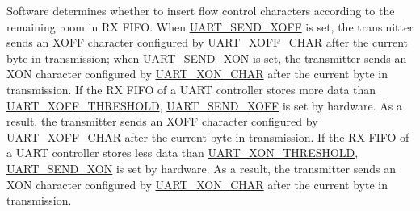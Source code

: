 \documentclass[main\_\_EN.tex]{subfiles}
\begin{document}
Software determines whether to insert flow control characters according to the remaining room in RX FIFO. When \hyperref[fielddesc:UARTSENDXOFF]{UART\_SEND\_XOFF} is set, the transmitter sends an XOFF character configured by \hyperref[fielddesc:UARTXOFFCHAR]{UART\_XOFF\_CHAR} after the current byte in transmission; when \hyperref[fielddesc:UARTSENDXON]{UART\_SEND\_XON} is set, the transmitter sends an XON character configured by \hyperref[fielddesc:UARTXONCHAR]{UART\_XON\_CHAR} after the current byte in transmission. If the RX FIFO of a UART controller stores more data than \hyperref[fielddesc:UARTXOFFTHRESHOLD]{UART\_XOFF\_THRESHOLD}, \hyperref[fielddesc:UARTSENDXOFF]{UART\_SEND\_XOFF} is set by hardware. As a result, the transmitter sends an XOFF character configured by \hyperref[fielddesc:UARTXOFFCHAR]{UART\_XOFF\_CHAR} after the current byte in transmission. If the RX FIFO of a UART controller stores less data than \hyperref[fielddesc:UARTXONTHRESHOLD]{UART\_XON\_THRESHOLD}, \hyperref[fielddesc:UARTSENDXON]{UART\_SEND\_XON} is set by hardware. As a result, the transmitter sends an XON character configured by \hyperref[fielddesc:UARTXONCHAR]{UART\_XON\_CHAR} after the current byte in transmission.
\end{document}
